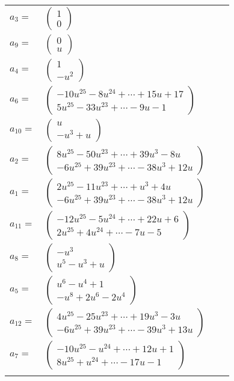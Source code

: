 \documentclass[1p]{elsarticle_modified}
\theoremstyle{definition}
\begin{document}
\begin{tabular}{m{7pt} m{180pt} m{7pt} m{180pt} }
\flushright $a_{3}=$&$\begin{pmatrix}1\\0\end{pmatrix}$ \\
\flushright $a_{9}=$&$\begin{pmatrix}0\\u\end{pmatrix}$ \\
\flushright $a_{4}=$&$\begin{pmatrix}1\\- u^2\end{pmatrix}$ \\
\flushright $a_{6}=$&$\begin{pmatrix}-10 u^{25}-8 u^{24}+\cdots+15 u+17\\5 u^{25}-33 u^{23}+\cdots-9 u-1\end{pmatrix}$ \\
\flushright $a_{10}=$&$\begin{pmatrix}u\\- u^3+u\end{pmatrix}$ \\
\flushright $a_{2}=$&$\begin{pmatrix}8 u^{25}-50 u^{23}+\cdots+39 u^3-8 u\\-6 u^{25}+39 u^{23}+\cdots-38 u^3+12 u\end{pmatrix}$ \\
\flushright $a_{1}=$&$\begin{pmatrix}2 u^{25}-11 u^{23}+\cdots+u^3+4 u\\-6 u^{25}+39 u^{23}+\cdots-38 u^3+12 u\end{pmatrix}$ \\
\flushright $a_{11}=$&$\begin{pmatrix}-12 u^{25}-5 u^{24}+\cdots+22 u+6\\2 u^{25}+4 u^{24}+\cdots-7 u-5\end{pmatrix}$ \\
\flushright $a_{8}=$&$\begin{pmatrix}- u^3\\u^5- u^3+u\end{pmatrix}$ \\
\flushright $a_{5}=$&$\begin{pmatrix}u^6- u^4+1\\- u^8+2 u^6-2 u^4\end{pmatrix}$ \\
\flushright $a_{12}=$&$\begin{pmatrix}4 u^{25}-25 u^{23}+\cdots+19 u^3-3 u\\-6 u^{25}+39 u^{23}+\cdots-39 u^3+13 u\end{pmatrix}$ \\
\flushright $a_{7}=$&$\begin{pmatrix}-10 u^{25}- u^{24}+\cdots+12 u+1\\8 u^{25}+u^{24}+\cdots-17 u-1\end{pmatrix}$\\&\end{tabular}
\end{document}
